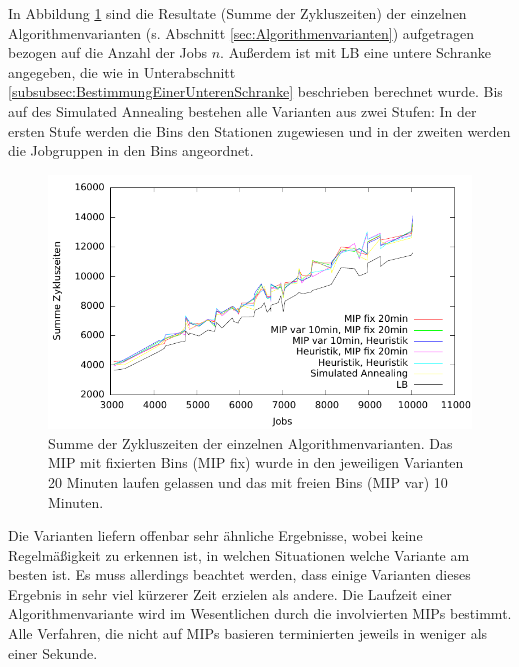 \documentclass{scrreprt}
\begin{document}
In Abbildung \ref{abb:kbplotn} sind die Resultate (Summe der Zykluszeiten) der einzelnen Algorithmenvarianten (s. Abschnitt \ref{sec:Algorithmenvarianten}) aufgetragen
bezogen auf die Anzahl der Jobs $n$.
Außerdem ist mit LB eine untere Schranke angegeben, die wie in Unterabschnitt \ref{subsubsec:BestimmungEinerUnterenSchranke} beschrieben berechnet wurde.
Bis auf des Simulated Annealing bestehen alle Varianten aus zwei Stufen: 
In der ersten Stufe werden die Bins den Stationen zugewiesen und in der zweiten werden die Jobgruppen in den Bins angeordnet.
\begin{figure}
    \begin{center}
        \includegraphics[width=.8\textwidth]{../prog/binpacking/results/kbplotn.pdf}
    \end{center}
    \caption{
        \label{abb:kbplotn}
        Summe der Zykluszeiten der einzelnen Algorithmenvarianten.
        Das MIP mit fixierten Bins (MIP fix) wurde in den jeweiligen Varianten 20 Minuten laufen gelassen
        und das mit freien Bins (MIP var) 10 Minuten.
    }
\end{figure}
Die Varianten liefern offenbar sehr ähnliche Ergebnisse, wobei keine Regelmäßigkeit zu erkennen ist, in welchen Situationen welche Variante am besten ist.
Es muss allerdings beachtet werden, dass einige Varianten dieses Ergebnis in sehr viel kürzerer Zeit erzielen als andere.
Die Laufzeit einer Algorithmenvariante wird im Wesentlichen durch die involvierten MIPs bestimmt.
Alle Verfahren, die nicht auf MIPs basieren terminierten jeweils in weniger als einer Sekunde.
\end{document}
